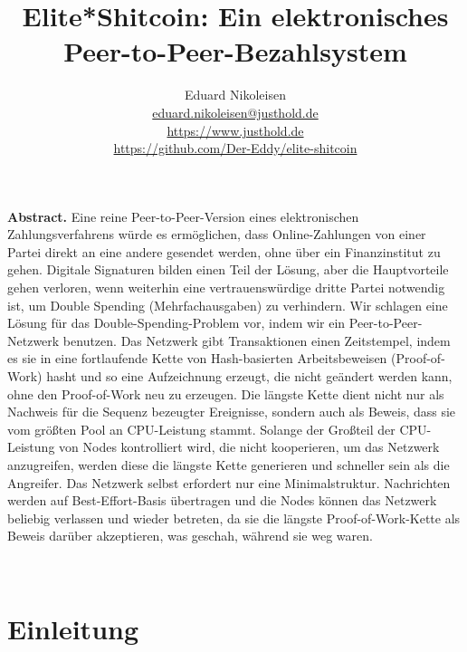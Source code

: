 \documentclass[a4paper, 10pt]{article}
\begin{document}
\renewcommand{\abstractname}{\vspace{-\baselineskip}}

\title{Elite*Shitcoin: Ein elektronisches Peer-to-Peer-Bezahlsystem}
\author{Eduard Nikoleisen \\ 
\href{mailto:eduard.nikoleisen@eddy-dev.net}{eduard.nikoleisen@justhold.de}\\ \url{https://www.justhold.de} \\ \url{https://github.com/Der-Eddy/elite-shitcoin}}
\date{}


\maketitle
\begin{center}
\parbox{0.8\linewidth}{\noindent \textbf{Abstract.} Eine reine Peer-to-Peer-Version eines elektronischen Zahlungsverfahrens würde es ermöglichen, dass Online-Zahlungen von einer Partei direkt an eine andere gesendet werden, ohne über ein Finanzinstitut zu gehen. Digitale Signaturen bilden einen Teil der Lösung, aber die Hauptvorteile gehen verloren, wenn weiterhin eine vertrauenswürdige dritte Partei notwendig ist, um Double Spending (Mehrfachausgaben) zu verhindern. Wir schlagen eine Lösung für das Double-Spending-Problem vor, indem wir ein Peer-to-Peer-Netzwerk benutzen. Das Netzwerk gibt Transaktionen einen Zeitstempel, indem es sie in eine fortlaufende Kette von Hash-basierten Arbeitsbeweisen (Proof-of-Work) hasht und so eine Aufzeichnung erzeugt, die nicht geändert werden kann, ohne den Proof-of-Work neu zu erzeugen. Die längste Kette dient nicht nur als Nachweis für die Sequenz bezeugter Ereignisse, sondern auch als Beweis, dass sie vom größten Pool an CPU-Leistung stammt. Solange der Großteil der CPU-Leistung von Nodes kontrolliert wird, die nicht kooperieren, um das Netzwerk anzugreifen, werden diese die längste Kette generieren und schneller sein als die Angreifer. Das Netzwerk selbst erfordert nur eine Minimalstruktur. Nachrichten werden auf Best-Effort-Basis übertragen und die Nodes können das Netzwerk beliebig verlassen und wieder betreten, da sie die längste Proof-of-Work-Kette als Beweis darüber akzeptieren, was geschah, während sie weg waren. }
\end{center}

\

\section{Einleitung}\label{introduction}
\end{document}
